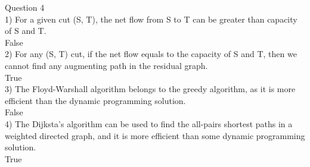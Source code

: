 \documentclass{article}
\begin{document}
Question 4\\
1) For a given cut (S, T), the net flow from S to T can be greater than capacity of S and T.\\
False\\
2) For any (S, T) cut, if the net flow equals to the capacity of S and T, then we cannot find any augmenting path in the residual graph.\\
True\\
3) The Floyd-Warshall algorithm belongs to the greedy algorithm, as it is more efficient than the dynamic programming solution.\\
False\\
4) The Dijksta's algorithm can be used to find the all-pairs shortest paths in a weighted directed graph, and it is more efficient than some dynamic programming solution.\\
True\\
\end{document}
